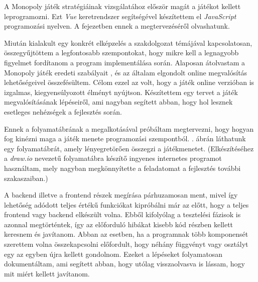 
A Monopoly játék stratégiáinak vizsgálatához először magát a játékot kellett leprogramozni. Ezt \textit{Vue} keretrendszer segítségével készítettem el \textit{JavaScript} programozási nyelven. A fejezetben ennek a megtervezéséről olvashatunk.


Miután kialakult egy konkrét elképzelés a szakdolgozat témájával kapcsolatosan, összegyűjtöttem a legfontosabb szempontokat, hogy mikre kell a legnagyobb figyelmet fordítanom a program implementálása során. Alaposan átolvastam a Monopoly játék eredeti szabályait \cite{coombs1987markup}, és az általam elgondolt online megvalósítás lehetőségeivel összefésültem. Célom ezzel az volt, hogy a játék online verzióban is izgalmas, kiegyensúlyozott élményt nyújtson. Készítettem egy tervet a játék megvalósításának lépéseiről, ami nagyban segített abban, hogy hol lesznek esetleges nehézségek a fejlesztés során.

Ennek a folyamatábrának a megalkotásával próbáltam megtervezni, hogy hogyan fog kinézni maga a játék menete programozási szempontból. . ábrán láthatunk egy folyamatábrát, amely lényegretörően összegzi a játékmenetet. (Elkészítéséhez a \textit{draw.io} nevezetű folyamatábra készítő ingyenes internetes programot használtam, mely nagyban megkönnyítette a feladatomat a fejlesztés további szakaszaiban.)

A backend illetve a frontend részek megírása párhuzamosan ment, mivel így lehetőség adódott teljes értékű funkciókat kipróbálni már az előtt, hogy a teljes frontend vagy backend elkészült volna. Ebből kifolyólag a tesztelési fázisok is azonnal megtörténtek, így az előforduló hibákat kisebb kód részben kellett keresnem és javítanom. Abban az esetben, ha a programnak több komponensét szerettem volna összekapcsolni előfordult, hogy néhány függvényt vagy osztályt egy az egyben újra kellett gondolnom. Ezeket a lépéseket folyamatosan dokumentáltam, ami segített abban, hogy utólag visszaolvasva is lássam, hogy mit miért kellett javítanom.

